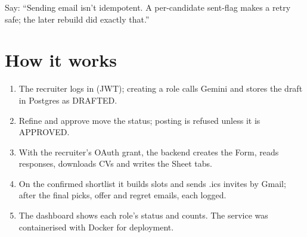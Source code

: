 \begin{sayit}
\begin{pic}
\end{pic}
Say: ``Sending email isn't idempotent. A per-candidate sent-flag makes a retry safe; the later rebuild did exactly that.''
\end{sayit}

\section{How it works}
\begin{enumerate}
  \item The recruiter logs in (JWT); creating a role calls Gemini and stores the draft in Postgres as DRAFTED.
  \item Refine and approve move the status; posting is refused unless it is APPROVED.
  \item With the recruiter's OAuth grant, the backend creates the Form, reads responses, downloads CVs and writes the Sheet tabs.
  \item On the confirmed shortlist it builds slots and sends .ics invites by Gmail; after the final picks, offer and regret emails, each logged.
  \item The dashboard shows each role's status and counts. The service was containerised with Docker for deployment.
\end{enumerate}

